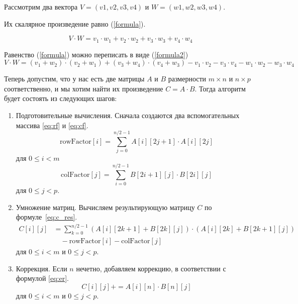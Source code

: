 Рассмотрим два вектора $V = (v1, v2, v3, v4)$ и $W = (w1, w2, w3, w4)$.  

Их скалярное произведение равно (\ref{formula}).

\begin{equation} \label{formula}
	V \cdot W=v_1 \cdot w_1 + v_2 \cdot w_2 + v_3 \cdot w_3 + v_4 \cdot w_4
\end{equation}

Равенство (\ref{formula}) можно переписать в виде (\ref{formula2}) 
\begin{equation} \label{formula2}
	V \cdot W=(v_1 + w_2) \cdot (v_2 + w_1) + (v_3 + w_4) \cdot (v_4 + w_3) - v_1 \cdot v_2 - v_3 \cdot v_4 - w_1 \cdot w_2 - w_3 \cdot w_4
\end{equation}

Теперь допустим, что у нас есть две матрицы $A$ и $B$ размерности $m \times n$ и $n \times p$ соответственно, и мы хотим найти их произведение $C = A \cdot B$.
Тогда алгоритм будет состоять из следующих шагов:

\begin{enumerate}
	\item Подготовительные вычисления. Сначала создаются два вспомогательных массива \eqref{eq:rf} и \eqref{eq:cf}.
	\begin{equation}
	\label{eq:rf}
	\text{{rowFactor}}[i] = \sum_{j=0}^{n/2 - 1} A[i][2j+1] \cdot A[i][2j]
	\end{equation}
	для \(0 \leq i < m\)
	\begin{equation}
	\label{eq:cf}
	\text{{colFactor}}[j] = \sum_{i=0}^{n/2 - 1} B[2i+1][j] \cdot B[2i][j]
	\end{equation}
	для \(0 \leq j < p\).
	
	\item Умножение матриц. Вычисляем результирующую матрицу $C$ по формуле~\eqref{eq:c_res}.
	\begin{equation}
		\label{eq:c_res}
		\begin{aligned}
			C[i][j] &= \sum_{k=0}^{n/2 - 1} (A[i][2k+1] + B[2k][j]) \cdot (A[i][2k] + B[2k+1][j]) \\
			&\quad - \text{{rowFactor}}[i] - \text{{colFactor}}[j]
		\end{aligned}
	\end{equation}
	для \(0 \leq i < m\) и \(0 \leq j < p\).
	
	\item Коррекция. Если \(n\) нечетно, добавляем коррекцию, в соответствии с формулой \eqref{eq:er}.
	\begin{equation}
		\label{eq:er}
	C[i][j] += A[i][n] \cdot B[n][j]
	\end{equation}
	для \(0 \leq i < m\) и \(0 \leq j < p\). 
\end{enumerate}

